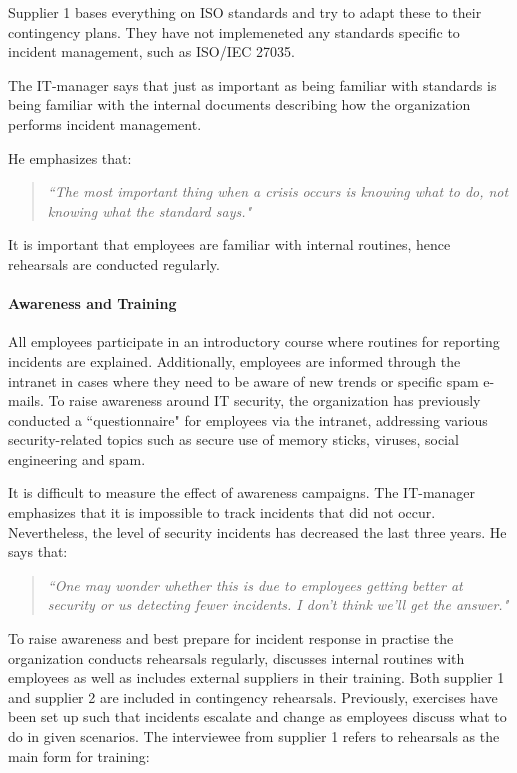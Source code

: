 Supplier 1 bases everything on \acs{ISO} standards and try to adapt these to their contingency plans. They have not implemeneted any standards specific to incident management, such as \acs{ISO}/\acs{IEC} 27035. 

The IT-manager says that just as important as being familiar with standards is being familiar with the internal documents describing how the organization performs incident management. 

He emphasizes that:
\begin{quote}
\textit{``The most important thing when a crisis occurs is knowing what to do, not knowing what the standard says."}
\end{quote}
It is important that employees are familiar with internal routines, hence rehearsals are conducted regularly.

\paragraph{Awareness and Training}
All employees participate in an introductory course where routines for reporting incidents are explained. Additionally, employees are informed through the intranet in cases where they need to be aware of new trends or specific spam e-mails. To raise awareness around IT security, the organization has previously conducted a ``questionnaire" for employees via the intranet, addressing various security-related topics such as secure use of memory sticks, viruses, social engineering and spam. 

It is difficult to measure the effect of awareness campaigns. The IT-manager emphasizes that it is impossible to track incidents that did not occur. Nevertheless, the level of security incidents has decreased the last three years. He says that:
\begin{quote}
\textit{``One may wonder whether this is due to employees getting better at security or us detecting fewer incidents. I don't think we'll get the answer."}
\end{quote}
 
To raise awareness and best prepare for incident response in practise the organization conducts rehearsals regularly, discusses internal routines with employees as well as includes external suppliers in their training. Both supplier 1 and supplier 2 are included in contingency rehearsals. Previously, exercises have been set up such that incidents escalate and change as employees discuss what to do in given scenarios. The interviewee from supplier 1 refers to rehearsals as the main form for training:

